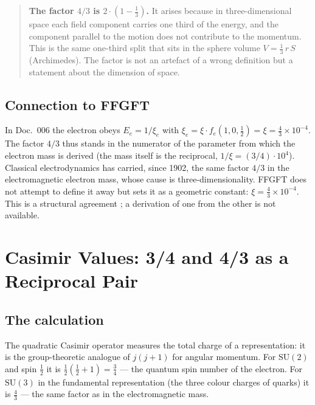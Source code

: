 \begin{quote}
\textbf{The factor $4/3$ is $2\cdot(1-\tfrac13)$.} It arises because in
three-dimensional space each field component carries one third of the energy,
and the component parallel to the motion does not contribute to the momentum.
This is the same one-third split that sits in the sphere volume $V = \tfrac13\,r\,S$
(Archimedes). The factor is not an artefact of a wrong definition but a
statement about the dimension of space.
\end{quote}

\subsection{Connection to FFGFT \SM}

In Doc.~006 the electron obeys $E_e = 1/\xi_e$ with $\xi_e = \xi\cdot f_e(1,0,\tfrac12)
= \xi = \tfrac{4}{3}\times10^{-4}$. The factor $4/3$ thus stands in the
numerator of the parameter from which the electron mass is derived (the mass
itself is the reciprocal, $1/\xi = (3/4)\cdot10^4$). Classical electrodynamics
has carried, since 1902, the same factor $4/3$ in the electromagnetic electron
mass, whose cause is three-dimensionality. FFGFT does not attempt to define it
away but sets it as a geometric constant: $\xi = \tfrac{4}{3}\times10^{-4}$. This is a structural agreement \SM; a
derivation of one from the other is not available.

\section{Casimir Values: 3/4 and 4/3 as a Reciprocal Pair}
\label{sec:casimir}

\subsection{The calculation \EM}

The quadratic Casimir operator measures the total charge of a representation: it
is the group-theoretic analogue of $j(j+1)$ for angular momentum. For
$\mathrm{SU}(2)$ and spin $\tfrac{1}{2}$ it is $\tfrac{1}{2}(\tfrac{1}{2}+1)
= \tfrac{3}{4}$ --- the quantum spin number of the electron. For $\mathrm{SU}(3)$
in the fundamental representation (the three colour charges of quarks) it is
$\tfrac{4}{3}$ --- the same factor as in the electromagnetic mass.


